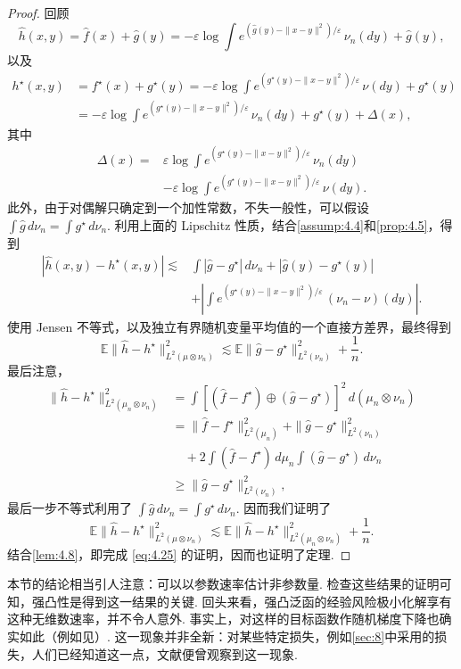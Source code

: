 \begin{proof}
回顾
$$\widehat h(x,y)=\widehat f(x)+\widehat g(y)
=-\varepsilon\log\int e^{(\widehat g(y)-\|x-y\|^2)/\varepsilon}\,\nu_n(dy)+\widehat g(y),$$
以及
$$\begin{aligned}
h^\star(x,y)&=f^\star(x)+g^\star(y)
=-\varepsilon\log\int e^{(g^\star(y)-\|x-y\|^2)/\varepsilon}\,\nu(dy)+g^\star(y)\\
&=-\varepsilon\log\int e^{(g^\star(y)-\|x-y\|^2)/\varepsilon}\,\nu_n(dy)
+g^\star(y)+\Delta(x),
\end{aligned}$$
其中
$$\begin{aligned}
\Delta(x)={}&\varepsilon\log\int e^{(g^\star(y)-\|x-y\|^2)/\varepsilon}\,\nu_n(dy)\\
&-\varepsilon\log\int e^{(g^\star(y)-\|x-y\|^2)/\varepsilon}\,\nu(dy).
\end{aligned}$$
此外，由于对偶解只确定到一个加性常数，不失一般性，可以假设 $\int\widehat g\,d\nu_n=\int g^\star\,d\nu_n$. 利用上面的 Lipschitz 性质，结合\autoref{assump:4.4}和\autoref{prop:4.5}，得到
$$\begin{aligned}
|\widehat h(x,y)-h^\star(x,y)|\lesssim{}&\int|\widehat g-g^\star|\,d\nu_n
+|\widehat g(y)-g^\star(y)|\\
&+\left|\int e^{(g^\star(y)-\|x-y\|^2)/\varepsilon}\,(\nu_n-\nu)(dy)\right|.
\end{aligned}$$
使用 Jensen 不等式，以及独立有界随机变量平均值的一个直接方差界，最终得到
$$\mathbb E\|\widehat h-h^\star\|_{L^2(\mu\otimes\nu_n)}^2
\lesssim\mathbb E\|\widehat g-g^\star\|_{L^2(\nu_n)}^2+\frac1n.$$
最后注意，
$$\begin{aligned}
\|\widehat h-h^\star\|_{L^2(\mu_n\otimes\nu_n)}^2
&=\int[(\widehat f-f^\star)\oplus(\widehat g-g^\star)]^2\,d(\mu_n\otimes\nu_n)\\
&=\|\widehat f-f^\star\|_{L^2(\mu_n)}^2+\|\widehat g-g^\star\|_{L^2(\nu_n)}^2\\
&\quad+2\int(\widehat f-f^\star)\,d\mu_n\int(\widehat g-g^\star)\,d\nu_n\\
&\ge\|\widehat g-g^\star\|_{L^2(\nu_n)}^2,
\end{aligned}$$
最后一步不等式利用了 $\int\widehat g\,d\nu_n=\int g^\star\,d\nu_n$. 因而我们证明了
$$\mathbb E\|\widehat h-h^\star\|_{L^2(\mu\otimes\nu_n)}^2
\lesssim\mathbb E\|\widehat h-h^\star\|_{L^2(\mu_n\otimes\nu_n)}^2+\frac1n.$$
结合\autoref{lem:4.8}，即完成 \eqref{eq:4.25} 的证明，因而也证明了定理.
\end{proof}

本节的结论相当引人注意：可以以参数速率估计非参数量. 检查这些结果的证明可知，强凸性是得到这一结果的关键. 回头来看，强凸泛函的经验风险极小化解享有这种无维数速率，并不令人意外. 事实上，对这样的目标函数作随机梯度下降也确实如此（例如见\cite[定理4]{ref174}）. 这一现象并非全新：对某些特定损失，例如\autoref{sec:8}中采用的损失，人们已经知道这一点，文献\cite{ref323}便曾观察到这一现象.
